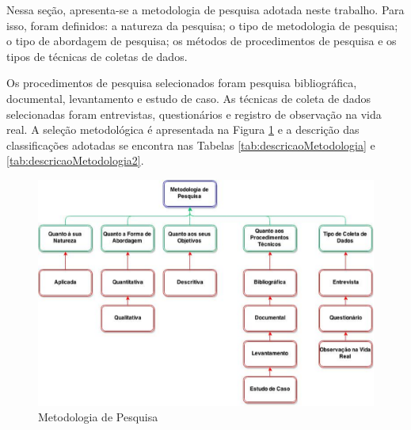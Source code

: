 Nessa seção, apresenta-se a metodologia de pesquisa adotada neste trabalho. Para
isso, foram definidos: a natureza da pesquisa; o tipo de metodologia de pesquisa; o tipo de abordagem de pesquisa; os métodos de procedimentos de pesquisa e os tipos de técnicas
de coletas de dados.

Os procedimentos de pesquisa selecionados foram pesquisa bibliográfica, documental, levantamento e estudo de caso. As técnicas de coleta de dados selecionadas foram
entrevistas, questionários e registro de observação na vida real. A seleção metodológica é apresentada na Figura \ref{7eixosqualidade} e a descrição das classificações adotadas se encontra nas Tabelas \ref{tab:descricaoMetodologia} e \ref{tab:descricaoMetodologia2}.

\begin{figure}[h!]
\centering
\includegraphics[keepaspectratio=false,scale=0.5]{figuras/figuras_nilton/selecaoMetodologica.eps}
\caption{Metodologia de Pesquisa}
\label{7eixosqualidade}
\end{figure}

\begin{table}[!ht]
	\begin{center}
	
	 
	\caption{Descrição das classificações adotadas de pesquisa, conceitos extraídos de   parte 1.}
	\label{tab:descricaoMetodologia}
	\end{center}
	\end{table}	
	\FloatBarrier
	
	
	
	\begin{table}[!ht]
	\begin{center}
	
	 
	\caption{Descrição das classificações adotadas de pesquisa, conceitos extraídos de   parte 2.}
	\label{tab:descricaoMetodologia2}
	\end{center}
	\end{table}	
	\FloatBarrier

